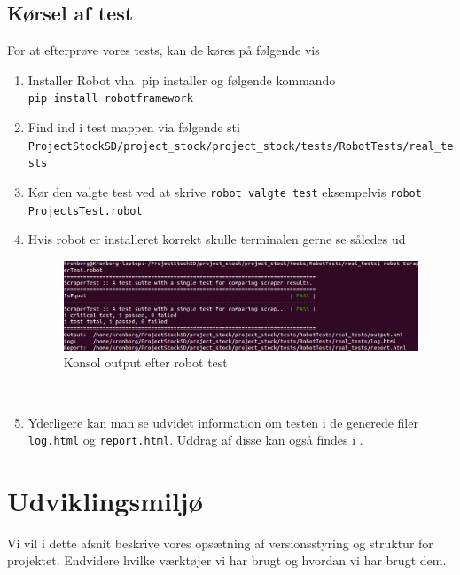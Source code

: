 \documentclass[12pt]{article}
\begin{document}
\subsection{Kørsel af test}
For at efterprøve vores tests, kan de køres på følgende vis
\begin{enumerate}
  \item Installer Robot vha. pip installer og følgende kommando\\
  \texttt{pip install robotframework}
  \item Find ind i test mappen via følgende sti \\ \texttt{ProjectStockSD/project\_stock/project\_stock/tests/RobotTests/real\_tests}
  \item Kør den valgte test ved at skrive \texttt{robot valgte test} eksempelvis
  \texttt{robot ProjectsTest.robot}
  \item Hvis robot er installeret korrekt skulle terminalen gerne se således ud
    \begin{figure}[H]
        \centering
        \includegraphics[scale=0.5]{test.png}
        \caption{Konsol output efter robot test}
        \label{fig:console output}
    \end{figure}~
  \item Yderligere kan man se udvidet information om testen i de generede filer \texttt{log.html} og \texttt{report.html}. Uddrag af disse kan også findes i .
\end{enumerate}
\section{Udviklingsmiljø}
\label{sec:udvikling}
Vi vil i dette afsnit beskrive vores opsætning af versionsstyring og struktur for projektet. Endvidere hvilke værktøjer vi har brugt og hvordan vi har brugt dem.
\end{document}
